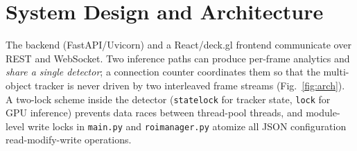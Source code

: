 \documentclass[conference]{IEEEtran}
\renewcommand{\_}{\textunderscore\allowbreak}
\begin{document}
\section{System Design and Architecture}\label{sec:design}
The backend (FastAPI/Uvicorn) and a React/deck.gl frontend communicate over REST
and WebSocket. Two inference paths can produce per-frame analytics and
\emph{share a single detector}; a connection counter coordinates them so that the
multi-object tracker is never driven by two interleaved frame streams
(Fig.~\ref{fig:arch}). A two-lock scheme inside the detector
(\texttt{\_state\_lock} for tracker state, \texttt{\_lock} for GPU inference)
prevents data races between thread-pool threads, and module-level write locks
in \texttt{main.py} and \texttt{roi\_manager.py} atomize all JSON configuration
read-modify-write operations.
\end{document}
